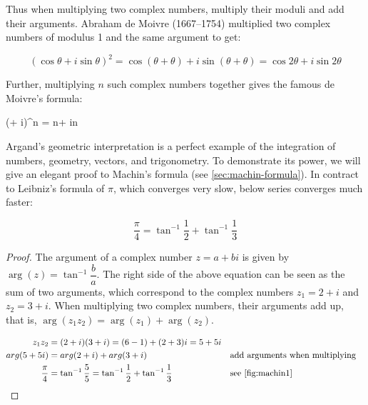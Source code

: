 \documentclass[b5paper]{article}
\begin{document}
\label{sec:proof-to-machin}
Thus when multiplying two complex numbers, multiply their moduli and add their arguments. Abraham de Moivre (1667–1754) multiplied two complex numbers of modulus 1 and the same argument to get:

\[
(\cos \theta + i\sin \theta)^2 = \cos (\theta + \theta) + i\sin (\theta + \theta) = \cos 2\theta + i\sin 2\theta
\]

Further, multiplying $n$ such complex numbers together gives the famous de Moivre's formula:

\be \label{eq:de-Moivre}
(\cos \theta + i\sin \theta)^n = \cos n\theta + i\sin n\theta
\ee

Argand's geometric interpretation is a perfect example of the integration of numbers, geometry, vectors, and trigonometry. To demonstrate its power, we will give an elegant proof to Machin's formula (see \cref{sec:machin-formula}). In contract to Leibniz's formula of $\pi$, which converges very slow, below series converges much faster:

\[
\frac{\pi}{4} = \tan^{-1} \frac{1}{2} + \tan^{-1} \frac{1}{3}
\]

\begin{proof}
The argument of a complex number $z = a + bi$ is given by $\arg(z) = \tan^{-1}\dfrac{b}{a}$. The right side of the above equation can be seen as the sum of two arguments, which correspond to the complex numbers $z_1 = 2 + i$ and $z_2 = 3 + i$. When multiplying two complex numbers, their arguments add up, that is, $\arg(z_1 z_2) = \arg(z_1) + \arg(z_2)$.

\begin{align*}
z_1 z_2 &= (2+i)(3+i) = (6 - 1) + (2 + 3)i = 5 + 5i \\
arg(5 + 5i) &= arg(2+i) + arg(3+i) && \text{add arguments when multiplying} \\
\frac{\pi}{4} &= \tan^{-1}\frac{5}{5} = \tan^{-1}\frac{1}{2} + \tan^{-1}\frac{1}{3} && \text{see \cref{fig:machin1}} \qedhere
\end{align*}
\end{proof}
\end{document}
